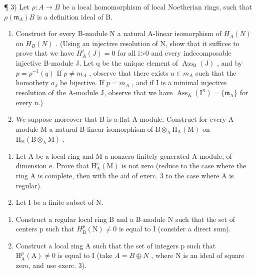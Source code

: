 ¶ 3) Let \(\rho: A \to B\) be a local homomorphism of local Noetherian rings, such that \(\rho(\mathfrak{m}_{A})B\) is a definition ideal of B.

\begin{enumerate}
\def\labelenumi{\alph{enumi})}
\item
  Construct for every B-module N a natural A-linear isomorphism of \(H_{A}(N)\) on \(H_{B}(N)\) . (Using an injective resolution of N, show that it suffices to prove that we have \(H_{A}^{i}(J)=0\) for all i\textgreater0 and every indecomposable injective B-module J. Let q be the unique element of \(\operatorname{Ass}_{\mathrm{B}}(\mathrm{J})\) , and by \(p=\rho^{-1}(q)\) If \(p\neq m_{A}\) , observe that there exists \(a\in m_{A}\) such that the homothety \(a_{J}\) be bijective. If \(p=m_{A}\) , and if I is a minimal injective resolution of the A-module J, observe that we have \(\operatorname{Ass}_{\mathrm{A}}(\mathrm{I}^{n})=\{\mathfrak{m}_{\mathrm{A}}\}\) for every n.)
\item
  We suppose moreover that B is a flat A-module. Construct for every A-module M a natural B-linear isomorphism of \(\mathrm{B}\otimes_{\mathrm{A}}\mathrm{H}_{\mathrm{A}}(\mathrm{M})\) on \(\mathrm{H}_{\mathrm{B}}(\mathrm{B}\otimes_{\mathrm{A}}\mathrm{M})\) .
\end{enumerate}

\begin{enumerate}
\def\labelenumi{\arabic{enumi})}
\setcounter{enumi}{3}
\item
  Let A be a local ring and M a nonzero finitely generated A-module, of dimension e. Prove that \(\mathrm{H}_{\mathrm{A}}^{e}(\mathrm{M})\) is not zero (reduce to the case where the ring A is complete, then with the aid of exerc. 3 to the case where A is regular).
\item
  Let I be a finite subset of N.
\end{enumerate}

\begin{enumerate}
\def\labelenumi{\alph{enumi})}
\item
  Construct a regular local ring B and a B-module N such that the set of centers p such that \(H_{\mathrm{B}}^{p}(\mathrm{N}) \neq 0\) is equal to I (consider a direct sum).
\item
  Construct a local ring A such that the set of integers p such that \(\mathrm{H}_{\mathrm{A}}^{p}(\mathrm{A}) \neq 0\) is equal to I (take \(A = B \oplus N\) , where N is an ideal of square zero, and use exerc. 3).
\end{enumerate}

